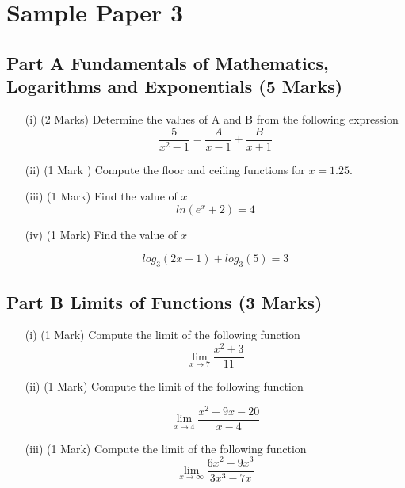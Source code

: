 \documentclass[]{article}
\begin{document}
\newpage 
\section*{Sample Paper 3}
\subsection*{Part A Fundamentals of Mathematics, Logarithms and Exponentials (5 Marks) } %
\begin{enumerate}

	\item[(i)] (2 Marks) Determine the values of A and B from the following expression
\[  \frac{5}{x^2 - 1} = \frac{A}{x-1} + \frac{B}{x+1}\]



\item[(ii)] (1 Mark )  Compute the floor and ceiling functions for $x= 1.25$. %


	
	
	\item[(iii)] (1 Mark) Find the value of $x$
	\[ln(e^x+2) = 4\]
	
	
	
	\item[(iv)] (1 Mark) Find the value of $x$
	
	\[log_3(2x - 1) + log_3(5) = 3\]
	
\end{enumerate}

\newpage
\subsection*{Part B Limits of Functions (3 Marks)}

\begin{itemize}
	\item[(i)] (1 Mark)  Compute the limit of the following function  %
	\[ \lim\limits_{x \rightarrow 7} \frac{x^2+3}{11}\]
	
	\item[(ii)] (1 Mark)  Compute the limit of the following function %
	
	\[\lim_{x \to 4 } \frac{x^2-9x-20}{x-4}\]
	
	\item[(iii)] (1 Mark)  Compute the limit of the following function %
	\[ \lim_{x \to \infty } \frac{6x^2 - 9x^3 }{3x^3 - 7x} \]	
\end{itemize}
\end{document}
